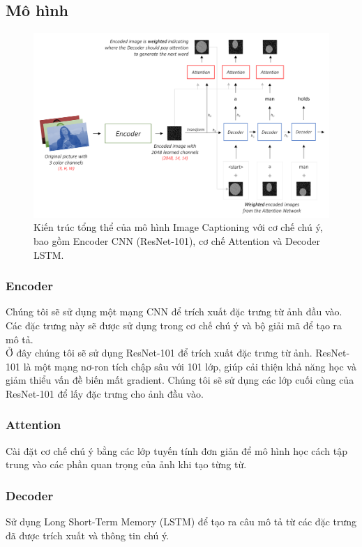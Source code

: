 \documentclass[conference]{IEEEtran}
\begin{document}
\subsection{Mô hình}
\begin{figure}[htbp]
    \centering
    \includegraphics[width=\linewidth]{attachments/model.png}
    \caption{Kiến trúc tổng thể của mô hình Image Captioning với cơ chế chú ý, bao gồm Encoder CNN (ResNet-101), cơ chế Attention và Decoder LSTM.}
    \label{fig:model}
\end{figure}
\subsubsection{Encoder}
Chúng tôi sẽ sử dụng một mạng CNN để trích xuất đặc trưng từ ảnh đầu vào. Các đặc trưng này sẽ được sử dụng trong cơ chế chú ý và bộ giải mã để tạo ra mô tả.\\
Ở đây chúng tôi sẽ sử dụng ResNet-101 để trích xuất đặc trưng từ ảnh. ResNet-101 là một mạng nơ-ron tích chập sâu với 101 lớp, giúp cải thiện khả năng học và giảm thiểu vấn đề biến mất gradient. Chúng tôi sẽ sử dụng các lớp cuối cùng của ResNet-101 để lấy đặc trưng cho ảnh đầu vào.

\subsubsection{Attention}
Cài đặt cơ chế chú ý bằng các lớp tuyến tính đơn giản để mô hình học cách tập trung vào các phần quan trọng của ảnh khi tạo từng từ.

\subsubsection{Decoder}
Sử dụng Long Short-Term Memory (LSTM) để tạo ra câu mô tả từ các đặc trưng đã được trích xuất và thông tin chú ý.
\end{document}
